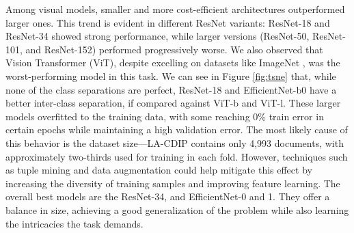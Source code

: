 Among visual models, smaller and more cost-efficient architectures outperformed larger ones. This trend is evident in different ResNet variants: ResNet-18 and ResNet-34 showed strong performance, while larger versions (ResNet-50, ResNet-101, and ResNet-152) performed progressively worse. We also observed that Vision Transformer (ViT), despite excelling on datasets like ImageNet \cite{imagenet}, was the worst-performing model in this task. We can see in Figure \ref{fig:tsne} that, while none of the class separations are perfect, ResNet-18 and EfficientNet-b0 have a better inter-class separation, if compared against ViT-b and ViT-l. These larger models overfitted to the training data, with some reaching 0\% train error in certain epochs while maintaining a high validation error. The most likely cause of this behavior is the dataset size—LA-CDIP contains only 4,993 documents, with approximately two-thirds used for training in each fold. However, techniques such as tuple mining and data augmentation could help mitigate this effect by increasing the diversity of training samples and improving feature learning. The overall best models are the ResNet-34, and EfficientNet-0 and 1. They offer a balance in size, achieving a good generalization of the problem while also learning the intricacies the task demands.


